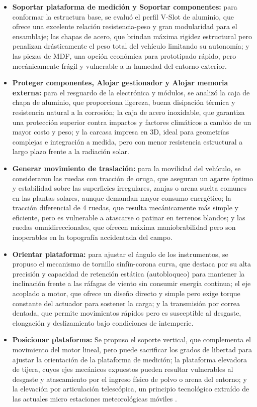\begin{itemize}
	\item \textbf{Soportar plataforma de medición y Soportar componentes:} para conformar la estructura base, se evaluó el perfil V-Slot de aluminio, que ofrece una excelente relación resistencia-peso y gran modularidad para el ensamblaje; las chapas de acero, que brindan máxima rigidez estructural pero penalizan drásticamente el peso total del vehículo limitando su autonomía; y las piezas de MDF, una opción económica para prototipado rápido, pero mecánicamente frágil y vulnerable a la humedad del entorno exterior.
	
	\item \textbf{Proteger componentes, Alojar gestionador y Alojar memoria externa:} para el resguardo de la electrónica y módulos, se analizó la caja de chapa de aluminio, que proporciona ligereza, buena disipación térmica y resistencia natural a la corrosión; la caja de acero inoxidable, que garantiza una protección superior contra impactos y factores climáticos a cambio de un mayor costo y peso; y la carcasa impresa en 3D, ideal para geometrías complejas e integración a medida, pero con menor resistencia estructural a largo plazo frente a la radiación solar.
	
	\item \textbf{Generar movimiento de traslación:} para la movilidad del vehículo, se consideraron las ruedas con tracción de oruga, que aseguran un agarre óptimo y estabilidad sobre las superficies irregulares, zanjas o arena suelta comunes en las plantas solares, aunque demandan mayor consumo energético; la tracción diferencial de 4 ruedas, que resulta mecánicamente más simple y eficiente, pero es vulnerable a atascarse o patinar en terrenos blandos; y las ruedas omnidireccionales, que ofrecen máxima maniobrabilidad pero son inoperables en la topografía accidentada del campo.
	
	\item \textbf{Orientar plataforma:} para ajustar el ángulo de los instrumentos, se propuso el mecanismo de tornillo sinfín-corona curva, que destaca por su alta precisión y capacidad de retención estática (autobloqueo) para mantener la inclinación frente a las ráfagas de viento sin consumir energía continua; el eje acoplado a motor, que ofrece un diseño directo y simple pero exige torque constante del actuador para sostener la carga; y la transmisión por correa dentada, que permite movimientos rápidos pero es susceptible al desgaste, elongación y deslizamiento bajo condiciones de intemperie.
	
	 \item \textbf{Posicionar plataforma:} Se propuso el soporte vertical, que complementa el movimiento del motor lineal, pero puede sacrificar los grados de libertad para ajustar la orientación de la plataforma de medición; la plataforma elevadora de tijera, cuyos ejes mecánicos expuestos pueden resultar vulnerables al desgaste y atascamiento por el ingreso físico de polvo o arena del entorno; y la elevación por articulación telescópica, un principio tecnológico extraído de las actuales micro estaciones meteorológicas móviles \citep{CN222047271U}.

\end{itemize}
